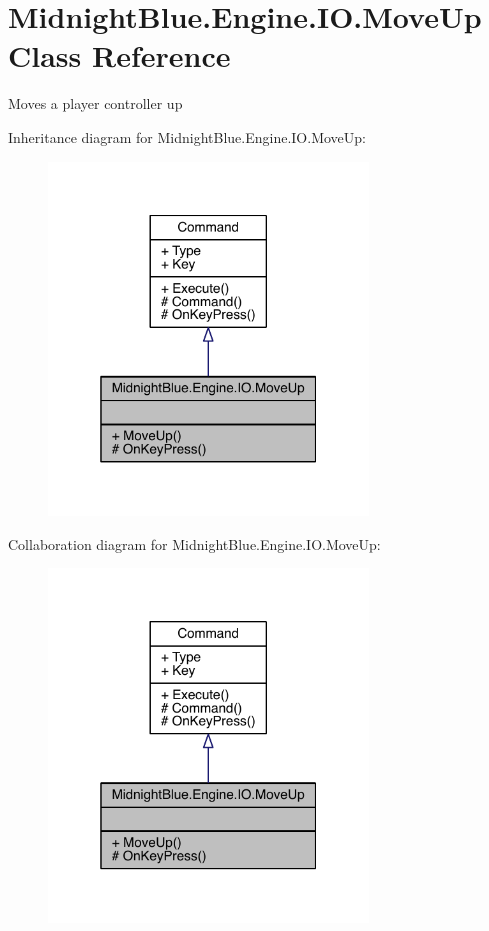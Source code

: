 \hypertarget{class_midnight_blue_1_1_engine_1_1_i_o_1_1_move_up}{}\section{Midnight\+Blue.\+Engine.\+I\+O.\+Move\+Up Class Reference}
\label{class_midnight_blue_1_1_engine_1_1_i_o_1_1_move_up}


Moves a player controller up  




Inheritance diagram for Midnight\+Blue.\+Engine.\+I\+O.\+Move\+Up\+:
\nopagebreak
\begin{figure}[H]
\begin{center}
\leavevmode
\includegraphics[width=241pt]{class_midnight_blue_1_1_engine_1_1_i_o_1_1_move_up__inherit__graph}
\end{center}
\end{figure}


Collaboration diagram for Midnight\+Blue.\+Engine.\+I\+O.\+Move\+Up\+:
\nopagebreak
\begin{figure}[H]
\begin{center}
\leavevmode
\includegraphics[width=241pt]{class_midnight_blue_1_1_engine_1_1_i_o_1_1_move_up__coll__graph}
\end{center}
\end{figure}
